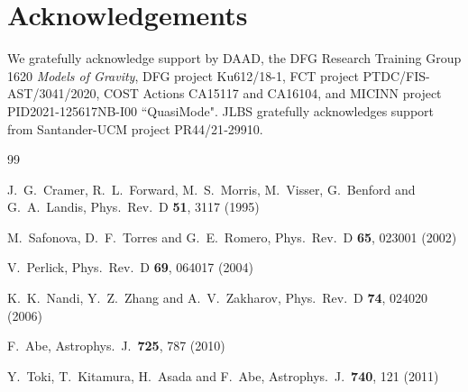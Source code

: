 \documentclass{article}
\begin{document}
\section*{Acknowledgements}

We gratefully acknowledge support by DAAD, the DFG Research Training Group 1620 \textit{Models of Gravity}, 
DFG project Ku612/18-1, 
FCT project PTDC/FIS-AST/3041/2020, COST Actions CA15117 and CA16104, and MICINN project PID2021-125617NB-I00 ``QuasiMode".
JLBS gratefully acknowledges support from Santander-UCM project PR44/21‐29910.


\begin{small}
\begin{thebibliography}{99}
%


  J.~G.~Cramer, R.~L.~Forward, M.~S.~Morris, M.~Visser, G.~Benford and G.~A.~Landis,
  Phys.\ Rev.\ D {\bf 51}, 3117 (1995)

  M.~Safonova, D.~F.~Torres and G.~E.~Romero,
  Phys.\ Rev.\ D {\bf 65}, 023001 (2002)

  V.~Perlick,
  Phys.\ Rev.\ D {\bf 69}, 064017 (2004)

  K.~K.~Nandi, Y.~Z.~Zhang and A.~V.~Zakharov,
  Phys.\ Rev.\ D {\bf 74}, 024020 (2006)

  F.~Abe,
  Astrophys.\ J.\  {\bf 725}, 787 (2010)

  Y.~Toki, T.~Kitamura, H.~Asada and F.~Abe,
  Astrophys.\ J.\  {\bf 740}, 121 (2011)


\end{thebibliography}
\end{small}
\end{document}
